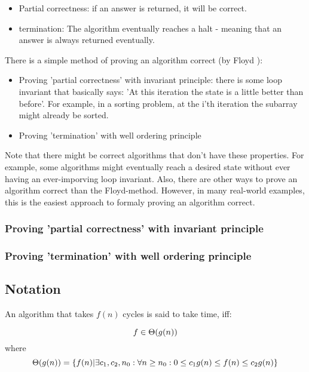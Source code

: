 \begin{itemize}
    \item Partial correctness: if an answer is returned, it will be correct.
    \item termination: The algorithm eventually reaches a halt - meaning that an answer is always returned eventually. 
\end{itemize}

There is a simple method of proving an algorithm correct (by Floyd ):
\begin{itemize}
    \item Proving 'partial correctness' with invariant principle: there is some loop invariant that basically says: 'At this iteration the state is a little better than before'. For example, in a sorting problem, at the i'th iteration the subarray  might already be sorted. 
    \item Proving 'termination' with well ordering principle
\end{itemize}

Note that there might be correct algorithms that don't have these properties. For example, some algorithms might eventually reach a desired state without ever having an ever-imporving loop invariant. Also, there are other ways to prove an algorithm correct than the Floyd-method. However, in many real-world examples, this is the easiest approach to formaly proving an algorithm correct. 

\subsubsection{ Proving 'partial correctness' with invariant principle }



\subsubsection{ Proving 'termination' with well ordering principle }


\subsection{Notation}

An algorithm that takes $f(n)$ cycles is said to take  time, iff: 

$$ f \in \Theta(g(n)) $$ 
where 
$$ \Theta(g(n)) = \{ f(n) | \exists c_1, c_2, n_0 : \forall n \geq n_0:  0 \leq c_1 g(n) \leq f(n) \leq c_2 g(n) \} $$

